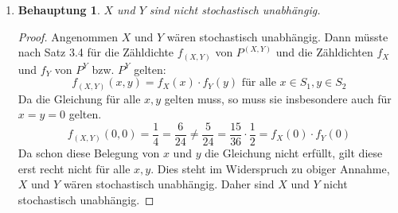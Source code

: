 \documentclass[a4paper]{scrartcl}
\newtheorem*{behaupt}{Behauptung}
\begin{document}
\begin{enumerate}[label=\bfseries\arabic*.]
\begin{enumerate}[label=(\alph*)]
\begin{enumerate}[label=(\alph{enumi}.\arabic*)]
\begin{proof}
\begin{align*}
\begin{split}
                                \end{split} \\
                                \begin{split}
                                    f_Y(1) &= \sum_{x \in S_1} f_{(X, Y)}(x, 1)
                                    = f_Y(0, 1) + f_Y(1, 1) + f_Y(2, 1) \\
                                    &= \frac{1}{6} + \frac{1}{9} + \frac{2}{9}
                                    = \frac{9}{18} = \frac{1}{2}
                                \end{split}
                            \end{align*}
                        \end{proof}

                    \item
                        \begin{behaupt}
                            $X$ und $Y$ sind nicht stochastisch unabhängig.
                        \end{behaupt}
                        \begin{proof}
                            Angenommen $X$ und $Y$ wären stochastisch
                            unabhängig.
                            Dann müsste nach Satz 3.4 für die Zähldichte
                            $f_{(X, Y)}$ von $P^{(X, Y)}$ und die Zähldichten
                            $f_X$ und $f_Y$ von $P^Y$ bzw. $P^Y$ gelten:
                            \begin{equation*}
                                f_{(X, Y)} (x, y) = f_X(x) \cdot f_Y(y)
                                \text{ für alle } x \in S_1, y \in S_2
                            \end{equation*}
                            Da die Gleichung für alle $x, y$ gelten muss, so
                            muss sie insbesondere auch für $x = y = 0$ gelten.
                            \begin{equation*}
                                f_{(X, Y)}(0, 0) = \frac{1}{4} = \frac{6}{24}
                                \neq
                                \frac{5}{24} = \frac{15}{36} \cdot \frac{1}{2}
                                = f_X(0) \cdot f_Y(0)
                            \end{equation*}
                            Da schon diese Belegung von $x$ und $y$ die
                            Gleichung nicht erfüllt, gilt diese erst recht nicht
                            für alle $x, y$.
                            Dies steht im Widerspruch zu obiger Annahme, $X$ und
                            $Y$ wären stochastisch unabhängig.
                            Daher sind $X$ und $Y$ nicht stochastisch
                            unabhängig.
                        \end{proof}
                \end{enumerate}
        \end{enumerate}

\end{enumerate}
\end{document}
